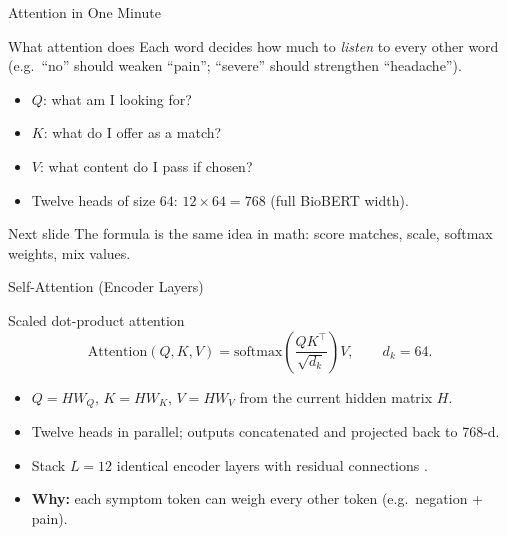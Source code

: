 \begin{frame}{Attention in One Minute}
	\begin{block}{What attention does}
		Each word decides how much to \emph{listen} to every other word
		(e.g.\ ``no'' should weaken ``pain''; ``severe'' should strengthen ``headache'').
	\end{block}
	\begin{itemize}
		\item \(Q\): what am I looking for?
		\item \(K\): what do I offer as a match?
		\item \(V\): what content do I pass if chosen?
		\item Twelve heads of size \(64\): \(12 \times 64 = 768\) (full BioBERT width).
	\end{itemize}
	\begin{exampleblock}{Next slide}
		The formula is the same idea in math: score matches, scale, softmax weights, mix values.
	\end{exampleblock}
\end{frame}

\begin{frame}{Self-Attention (Encoder Layers)}
	\begin{block}{Scaled dot-product attention}
		\[
		  \mathrm{Attention}(Q,K,V)
		  = \mathrm{softmax}\!\left(\frac{QK^{\top}}{\sqrt{d_k}}\right)V,
		  \qquad d_k = 64.
		\]
	\end{block}
	\begin{itemize}
		\item \(Q=HW_Q\), \(K=HW_K\), \(V=HW_V\) from the current hidden matrix \(H\).
		\item Twelve heads in parallel; outputs concatenated and projected back to 768-d.
		\item Stack \(L=12\) identical encoder layers with residual connections \citep{vaswani2017attention}.
		\item \textbf{Why:} each symptom token can weigh every other token (e.g.\ negation + pain).
	\end{itemize}
\end{frame}

